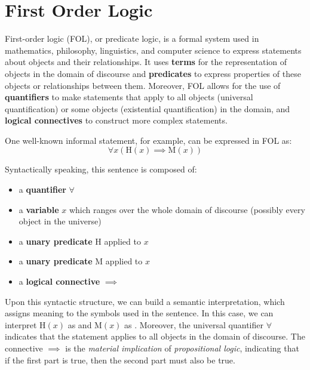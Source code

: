 \chapter{First Order Logic}\label{chap:first-order-logic}

\inlineminitoc{}

\noindent First-order logic (FOL), or predicate logic, is a formal system used in mathematics, philosophy, linguistics, and computer science to express statements about objects and their relationships.
It uses \textbf{terms} for the representation of objects in the domain of discourse and \textbf{predicates} to express properties of these objects or relationships between them.
Moreover, FOL allows for the use of \textbf{quantifiers} to make statements that apply to all objects (universal quantification) or some objects (existential quantification) in the domain, and \textbf{logical connectives} to construct more complex statements.

One well-known informal statement,  for example, can be expressed in FOL as:
\begin{equation*}
    \forall x \left( \text{H}(x) \implies \text{M}(x) \right)
\end{equation*}

Syntactically speaking, this sentence is composed of:
\begin{itemize}
    \item a \textbf{quantifier} \(\forall\)
    \item a \textbf{variable} \(x\) which ranges over the whole domain of discourse (possibly every object in the universe)
    \item a \textbf{unary predicate} \(\text{H}\) applied to \(x\)
    \item a \textbf{unary predicate} \(\text{M}\) applied to \(x\)
    \item a \textbf{logical connective} \(\implies\)
\end{itemize}

Upon this syntactic structure, we can build a semantic interpretation, which assigns meaning to the symbols used in the sentence.
In this case, we can interpret \(\text{H}(x)\) as  and \(\text{M}(x)\) as .
Moreover, the universal quantifier \(\forall\) indicates that the statement applies to all objects in the domain of discourse.
The connective \(\implies\) is the \emph{material implication} of \emph{propositional logic}, indicating that if the first part is true, then the second part must also be true.

